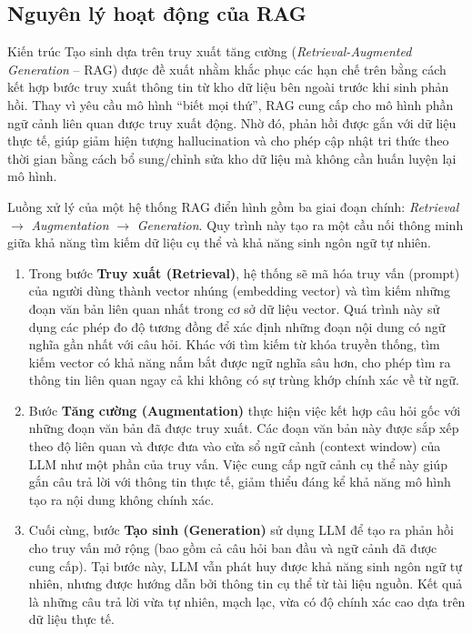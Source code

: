\subsection{Nguyên lý hoạt động của RAG}

Kiến trúc {Tạo sinh dựa trên truy xuất tăng cường} (\emph{Retrieval-Augmented Generation} -- RAG) được đề xuất nhằm khắc phục các hạn chế trên bằng cách kết hợp bước truy xuất thông tin từ kho dữ liệu bên ngoài trước khi sinh phản hồi. Thay vì yêu cầu mô hình ``biết mọi thứ'', RAG cung cấp cho mô hình phần ngữ cảnh liên quan được truy xuất động. Nhờ đó, phản hồi được gắn với dữ liệu thực tế, giúp giảm hiện tượng hallucination và cho phép cập nhật tri thức theo thời gian bằng cách bổ sung/chỉnh sửa kho dữ liệu mà không cần huấn luyện lại mô hình.

Luồng xử lý của một hệ thống RAG điển hình gồm ba giai đoạn chính: \emph{Retrieval} \(\rightarrow\) \emph{Augmentation} \(\rightarrow\) \emph{Generation}. Quy trình này tạo ra một cầu nối thông minh giữa khả năng tìm kiếm dữ liệu cụ thể và khả năng sinh ngôn ngữ tự nhiên.

\begin{enumerate}
    \item Trong bước \textbf{Truy xuất (Retrieval)}, hệ thống sẽ mã hóa truy vấn (prompt) của người dùng thành vector nhúng (embedding vector) và tìm kiếm những đoạn văn bản liên quan nhất trong cơ sở dữ liệu vector. Quá trình này sử dụng các phép đo độ tương đồng để xác định những đoạn nội dung có ngữ nghĩa gần nhất với câu hỏi. Khác với tìm kiếm từ khóa truyền thống, tìm kiếm vector có khả năng nắm bắt được ngữ nghĩa sâu hơn, cho phép tìm ra thông tin liên quan ngay cả khi không có sự trùng khớp chính xác về từ ngữ.

    \item Bước \textbf{Tăng cường (Augmentation)} thực hiện việc kết hợp câu hỏi gốc với những đoạn văn bản đã được truy xuất. Các đoạn văn bản này được sắp xếp theo độ liên quan và được đưa vào {cửa sổ ngữ cảnh} (context window) của LLM như một phần của truy vấn. Việc cung cấp ngữ cảnh cụ thể này giúp gắn câu trả lời với thông tin thực tế, giảm thiểu đáng kể khả năng mô hình tạo ra nội dung không chính xác.

    \item Cuối cùng, bước \textbf{Tạo sinh (Generation)} sử dụng LLM để tạo ra phản hồi cho truy vấn mở rộng (bao gồm cả câu hỏi ban đầu và ngữ cảnh đã được cung cấp). Tại bước này, LLM vẫn phát huy được khả năng sinh ngôn ngữ tự nhiên, nhưng được hướng dẫn bởi thông tin cụ thể từ tài liệu nguồn. Kết quả là những câu trả lời vừa tự nhiên, mạch lạc, vừa có độ chính xác cao dựa trên dữ liệu thực tế.
\end{enumerate}

